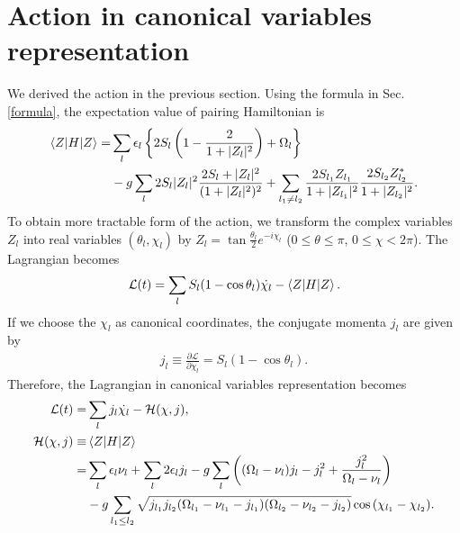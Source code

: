 \documentclass[11pt]{book} %
\begin{document}
\section{Action in canonical variables representation}
We derived the action in the previous section. Using the formula in Sec. \ref{formula}, the expectation value of pairing Hamiltonian is
\begin{align}
  \braket{Z|H|Z} =& \sum_l \epsilon_l \left\{ 2S_l\left( 1-\frac{2}{1+|Z_l|^2} \right) + \Omega_l \right\} \nonumber \\
   &- g\sum_l 2S_l|Z_l|^2\frac{2S_l+|Z_l|^2}{(1+|Z_l|^2)^2}
    + \sum_{l_1 \neq l_2} \frac{2S_{l_1}Z_{l_1}}{1+|Z_{l_1}|^2}\frac{2S_{l_2}Z_{l_2}^*}{1+|Z_{l_2}|^2} .
\end{align}
To obtain more tractable form of the action, we transform the complex variables $Z_l$ into real variables $(\theta_l,\chi_l)$
by $Z_l = \tan{\frac{\theta_l}{2}}e^{-i\chi_l}$ ($0\leq\theta\leq\pi$, $0\leq\chi<2\pi$). The Lagrangian becomes
\begin{align}
\mathcal{L}(t) = \sum_l S_l
	(1-\cos{\theta_l})\dot{\chi_l} - \braket{Z|H|Z} .
\end{align}
If we choose the $\chi_l$ as canonical coordinates, the conjugate momenta $j_l$ are given by
\begin{align}
  j_l\equiv \frac{\partial\mathcal{L}}{\partial\dot{\chi}_l}=S_l(1-\cos{\theta}_l) .
\end{align}
Therefore, the Lagrangian in canonical variables representation becomes
\begin{align}
	\mathcal{L}(t) =& \sum_l j_l\dot{\chi_l} - \mathcal{H}(\chi,j) ,\\
	\mathcal{H}(\chi,j) \equiv& \braket{Z|H|Z} \nonumber \\
	=& \sum_l \epsilon_l\nu_l + \sum_l 2\epsilon_lj_l - g\sum_l \left( (\Omega_l-\nu_l) j_l - j_l^2 +\frac{j_l^2}{\Omega_l-\nu_l} \right) \nonumber \\
	&- g\sum_{l_1\le l_2} \sqrt{j_{l_1}j_{l_2}(\Omega_{l_1}-\nu_{l_1}-j_{l_1})(\Omega_{l_2}-\nu_{l_2}-j_{l_2})}\cos{(\chi_{l_1}-\chi_{l_2})}   .
\end{align}



\end{document}
